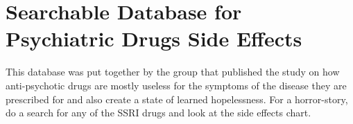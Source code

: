 \chapter{Searchable Database for Psychiatric Drugs Side Effects}

\begin{refsection}

This database was put together by the group that published the study on how anti-psychotic drugs are mostly useless for the symptoms of the disease they are prescribed for and also create a state of learned hopelessness. For a horror-story, do a search for any of the SSRI drugs and look at the side effects chart.\textsuperscript{\cite{urlc47bf402}}

\printbibliography[heading=subbibliography]

\end{refsection}
